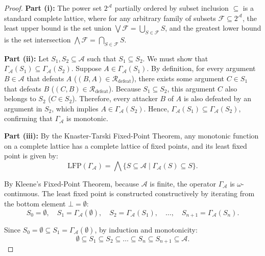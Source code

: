 \documentclass[11pt,a4paper]{article}
\begin{document}
\begin{proof}
\textbf{Part (i):} The power set $2^{\mathcal{A}}$ partially ordered by subset inclusion $\subseteq$ is a standard complete lattice, where for any arbitrary family of subsets $\mathcal{F} \subseteq 2^{\mathcal{A}}$, the least upper bound is the set union $\bigvee \mathcal{F} = \bigcup_{S \in \mathcal{F}} S$, and the greatest lower bound is the set intersection $\bigwedge \mathcal{F} = \bigcap_{S \in \mathcal{F}} S$.

\textbf{Part (ii):} Let $S_1, S_2 \subseteq \mathcal{A}$ such that $S_1 \subseteq S_2$. We must show that $\Gamma_{\mathcal{A}}(S_1) \subseteq \Gamma_{\mathcal{A}}(S_2)$.
Suppose $A \in \Gamma_{\mathcal{A}}(S_1)$. By definition, for every argument $B \in \mathcal{A}$ that defeats $A$ ($(B, A) \in \mathcal{R}_{\mathrm{defeat}}$), there exists some argument $C \in S_1$ that defeats $B$ ($(C, B) \in \mathcal{R}_{\mathrm{defeat}}$).
Because $S_1 \subseteq S_2$, this argument $C$ also belongs to $S_2$ ($C \in S_2$).
Therefore, every attacker $B$ of $A$ is also defeated by an argument in $S_2$, which implies $A \in \Gamma_{\mathcal{A}}(S_2)$.
Hence, $\Gamma_{\mathcal{A}}(S_1) \subseteq \Gamma_{\mathcal{A}}(S_2)$, confirming that $\Gamma_{\mathcal{A}}$ is monotonic.

\textbf{Part (iii):} By the Knaster-Tarski Fixed-Point Theorem, any monotonic function on a complete lattice has a complete lattice of fixed points, and its least fixed point is given by:
\begin{equation}
\mathrm{LFP}(\Gamma_{\mathcal{A}}) = \bigwedge \{ S \subseteq \mathcal{A} \mid \Gamma_{\mathcal{A}}(S) \subseteq S \}.
\end{equation}

By Kleene's Fixed-Point Theorem, because $\mathcal{A}$ is finite, the operator $\Gamma_{\mathcal{A}}$ is $\omega$-continuous. The least fixed point is constructed constructively by iterating from the bottom element $\bot = \emptyset$:
\begin{equation}
S_0 = \emptyset, \quad S_1 = \Gamma_{\mathcal{A}}(\emptyset), \quad S_2 = \Gamma_{\mathcal{A}}(S_1), \quad \dots, \quad S_{n+1} = \Gamma_{\mathcal{A}}(S_n).
\end{equation}

Since $S_0 = \emptyset \subseteq S_1 = \Gamma_{\mathcal{A}}(\emptyset)$, by induction and monotonicity:
\begin{equation}
\emptyset \subseteq S_1 \subseteq S_2 \subseteq \dots \subseteq S_n \subseteq S_{n+1} \subseteq \mathcal{A}.
\end{equation}


\end{proof}
\end{document}
